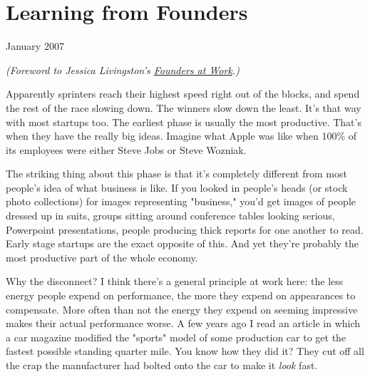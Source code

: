 \chapter{Learning from Founders}


            
              
                

January 2007

\emph{(Foreword to Jessica Livingston's
                    \href{http://www.amazon.com/gp/product/1590597141}{Founders at Work}.)}

Apparently sprinters reach their highest speed
                  right out of the blocks, and spend the rest of the race
                  slowing down. The winners slow down the least. It's that way
                  with most startups too. The earliest phase is usually the most
                  productive. That's when they have the really big ideas.
                  Imagine what Apple was like when 100\% of its employees were
                  either Steve Jobs or Steve Wozniak.

The striking
                  thing about this phase is that it's completely different from
                  most people's idea of what business is like. If you looked in
                  people's heads (or stock photo collections) for images
                  representing "business," you'd get images of people dressed up
                  in suits, groups sitting around conference tables looking
                  serious, Powerpoint presentations, people producing thick
                  reports for one another to read. Early stage startups are the
                  exact opposite of this. And yet they're probably the most
                  productive part of the whole economy.

Why the
                  disconnect? I think there's a general principle at work here:
                  the less energy people expend on performance, the more they
                  expend on appearances to compensate. More often than not the
                  energy they expend on seeming impressive makes their actual
                  performance worse. A few years ago I read an article in which
                  a car magazine modified the "sports" model of some production
                  car to get the fastest possible standing quarter mile. You
                  know how they did it? They cut off all the crap the
                  manufacturer had bolted onto the car to make it
                  \emph{look} fast.

